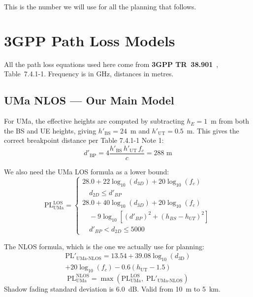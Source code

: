 \documentclass[10pt,a4paper,twocolumn]{article}
\begin{document}
This is the number we will use for all the planning that follows.

\section{3GPP Path Loss Models}
\label{sec:pathloss_models}

All the path loss equations used here come from \textbf{3GPP TR~38.901}~\cite{3gpp_38901}, Table~7.4.1-1. Frequency is in GHz, distances in metres.

\subsection{UMa NLOS --- Our Main Model}

For UMa, the effective heights are computed by subtracting $h_E = 1$~m from both the BS and UE heights, giving $h'_{\text{BS}} = 24$~m and $h'_{\text{UT}} = 0.5$~m. This gives the correct breakpoint distance per Table 7.4.1-1 Note 1:
\begin{equation}
d'_{\text{BP}} = 4 \frac{h'_{\text{BS}}\, h'_{\text{UT}}\, f_c}{c} = 288 \text{ m}
\end{equation}

We also need the UMa LOS formula as a lower bound:
{\small
\begin{equation}
\text{PL}_{\text{UMa}}^{\text{LOS}} = \begin{cases}
28.0 + 22\log_{10}(d_{3D}) + 20\log_{10}(f_c) \\
\quad d_{2D} \leq d'_{BP} \\[4pt]
28.0 + 40\log_{10}(d_{3D}) + 20\log_{10}(f_c) \\
\quad - 9\log_{10}\![(d'_{BP})^2 + (h_{BS} - h_{UT})^2] \\
\quad d'_{BP} < d_{2D} \leq 5000
\end{cases}
\end{equation}}

The NLOS formula, which is the one we actually use for planning:
\begin{multline}
\text{PL}'_{\text{UMa-NLOS}} = 13.54 + 39.08\log_{10}(d_{3\text{D}}) \\
+ 20\log_{10}(f_c) - 0.6(h_{\text{UT}} - 1.5)
\end{multline}
\begin{equation}
\text{PL}_{\text{UMa}}^{\text{NLOS}} = \max\!\left(\text{PL}_{\text{UMa}}^{\text{LOS}},\; \text{PL}'_{\text{UMa-NLOS}}\right)
\end{equation}
Shadow fading standard deviation is 6.0~dB. Valid from 10~m to 5~km.
\end{document}
